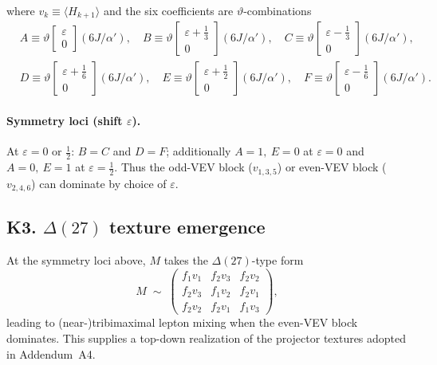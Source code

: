 \documentclass[11pt]{article}
\begin{document}
          where $v_k\equiv \langle H_{k+1}\rangle$ and the six coefficients are $\vartheta$-combinations
          \[
              \begin{aligned}
              &A\equiv \vartheta\!\left[\begin{smallmatrix}\varepsilon\\[-2pt]0\end{smallmatrix}\right]\!(6J/\alpha')\!,\quad
              B\equiv \vartheta\!\left[\begin{smallmatrix}\varepsilon+\tfrac13\\[-2pt]0\end{smallmatrix}\right]\!(6J/\alpha')\!,\quad
              C\equiv \vartheta\!\left[\begin{smallmatrix}\varepsilon-\tfrac13\\[-2pt]0\end{smallmatrix}\right]\!(6J/\alpha')\!,\\
              &D\equiv \vartheta\!\left[\begin{smallmatrix}\varepsilon+\tfrac16\\[-2pt]0\end{smallmatrix}\right]\!(6J/\alpha')\!,\quad
              E\equiv \vartheta\!\left[\begin{smallmatrix}\varepsilon+\tfrac12\\[-2pt]0\end{smallmatrix}\right]\!(6J/\alpha')\!,\quad
              F\equiv \vartheta\!\left[\begin{smallmatrix}\varepsilon-\tfrac16\\[-2pt]0\end{smallmatrix}\right]\!(6J/\alpha')\!.
              \end{aligned}
          \]

          \paragraph{Symmetry loci (shift $\varepsilon$).}
              At $\varepsilon=0$ or $\tfrac12$: $B=C$ and $D=F$; additionally $A=1,\ E=0$ at $\varepsilon=0$ and $A=0,\ E=1$ at $\varepsilon=\tfrac12$.
              Thus the odd-VEV block ($v_{1,3,5}$) or even-VEV block ($v_{2,4,6}$) can dominate by choice of $\varepsilon$.

  \subsection*{K3. $\Delta(27)$ texture emergence}
      At the symmetry loci above, $M$ takes the $\Delta(27)$-type form
      \[
          M\;\sim\;
          \begin{pmatrix}
          f_1 v_1 & f_2 v_3 & f_2 v_2\\
          f_2 v_3 & f_1 v_2 & f_2 v_1\\
          f_2 v_2 & f_2 v_1 & f_1 v_3
          \end{pmatrix},
      \]
      leading to (near-)tribimaximal lepton mixing when the even-VEV block dominates.
      This supplies a top-down realization of the projector textures adopted in Addendum~A4.
\end{document}
